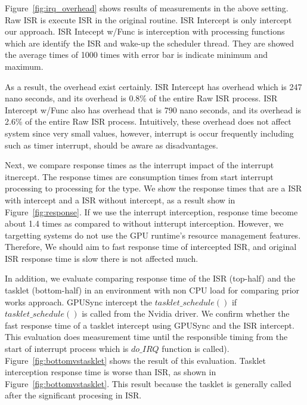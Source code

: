 Figure~\ref{fig:irq_overhead} shows results of measurements in the above setting.
Raw ISR is execute ISR in the original routine.
ISR Intercept is only intercept our approach.
ISR Intecept w/Func is interception with processing functions which are identify the ISR and wake-up the scheduler thread.
They are showed the average times of 1000 times with error bar is indicate minimum and maximum.

As a result, the overhead exist certainly.
ISR Intercept has overhead which is 247 nano seconds, and its overhead is 0.8\% of the entire Raw ISR process.
ISR Intercept w/Func also has overhead that is 790 nano seconds, and its overhead is 2.6\% of the entire Raw ISR process.
Intuitively, these overhead does not affect system since very small values,
however, interrupt is occur frequently including such as timer interrupt, should be aware as disadvantages.

Next, we compare response times as the interrupt impact of the interrupt itnercept.
The response times are consumption times from start interrupt processing to processing for the type.
We show the response times that are a ISR with intercept and a ISR without intercept, as a result show in Figure~\ref{fig:response}.
If we use the interrupt interception, response time become about 1.4 times as compared to without intterupt interception.
However, we targetting systems do not use the GPU runtime's resource management features.
Therefore, We should aim to fast response time of intercepted ISR, and original ISR response time is slow there is not affected much.

In addition, we evaluate comparing response time of the ISR (top-half) and the tasklet (bottom-half) in an environment with non CPU load for comparing prior works approach.
GPUSync intercept the $tasklet\_schedule()$ if $tasklet\_schedule()$ is called from the Nvidia driver.
We confirm whether the fast response time of a tasklet intercept using GPUSync and the ISR intercept.
This evaluation does measurement time until the responsible timing from the start of interrupt process which is $do\_IRQ$ function is called).
Figure~\ref{fig:bottomvstasklet} shows the result of this evaluation.
Tasklet interception response time is worse than ISR, as shown in Figure~\ref{fig:bottomvstasklet}.
This result because the tasklet is generally called after the significant procesing in ISR.




